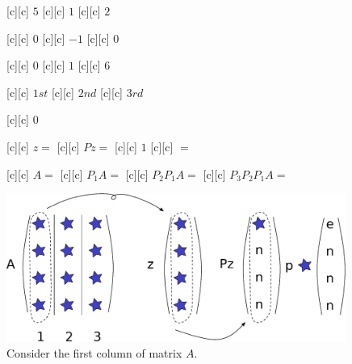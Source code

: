 \begin{figure}[htb!]
	\centering
	\footnotesize

	[c] {$5$}
	[c] {$1$}
	[c] {$2$}

	[c] {$0$}
	[c] {$-1$}
	[c] {$0$}

	[c] {$0$}
	[c] {$1$}
	[c] {$6$}

	[c] {$1st$}
	[c] {$2nd$}
	[c] {$3rd$}

	[c] {$0$}

	[c] {$z=$}
	[c] {$Pz=$}
	[c] {$1$}
	[c] {$=$}

	[c] {$A=$}
	[c] {$P_{1}A=$}
	[c] {$P_{2}P_{1}A=$}
	[c] {$P_{3}P_{2}P_{1}A=$}

	\includegraphics[width=0.99\textwidth]{householder_matrixA.eps}
	\caption{Consider the first column of matrix $A$.}
	\label{\LABEL}
\end{figure}